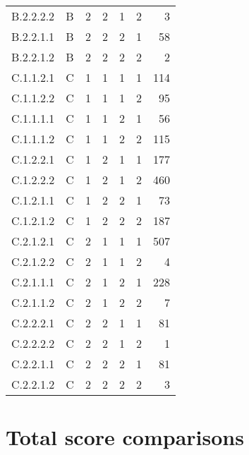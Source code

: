 \documentclass[11pt]{article}
\begin{document}
\begin{center}
\begin{tabular}{llrrrrr}
B.2.2.2.2 & B & 2 & 2 & 1 & 2 & 3\\
B.2.2.1.1 & B & 2 & 2 & 2 & 1 & 58\\
B.2.2.1.2 & B & 2 & 2 & 2 & 2 & 2\\
C.1.1.2.1 & C & 1 & 1 & 1 & 1 & 114\\
C.1.1.2.2 & C & 1 & 1 & 1 & 2 & 95\\
C.1.1.1.1 & C & 1 & 1 & 2 & 1 & 56\\
C.1.1.1.2 & C & 1 & 1 & 2 & 2 & 115\\
C.1.2.2.1 & C & 1 & 2 & 1 & 1 & 177\\
C.1.2.2.2 & C & 1 & 2 & 1 & 2 & 460\\
C.1.2.1.1 & C & 1 & 2 & 2 & 1 & 73\\
C.1.2.1.2 & C & 1 & 2 & 2 & 2 & 187\\
C.2.1.2.1 & C & 2 & 1 & 1 & 1 & 507\\
C.2.1.2.2 & C & 2 & 1 & 1 & 2 & 4\\
C.2.1.1.1 & C & 2 & 1 & 2 & 1 & 228\\
C.2.1.1.2 & C & 2 & 1 & 2 & 2 & 7\\
C.2.2.2.1 & C & 2 & 2 & 1 & 1 & 81\\
C.2.2.2.2 & C & 2 & 2 & 1 & 2 & 1\\
C.2.2.1.1 & C & 2 & 2 & 2 & 1 & 81\\
C.2.2.1.2 & C & 2 & 2 & 2 & 2 & 3\\
\end{tabular}
\end{center}

\section{Total score comparisons}
\label{sec-3}
\end{document}
